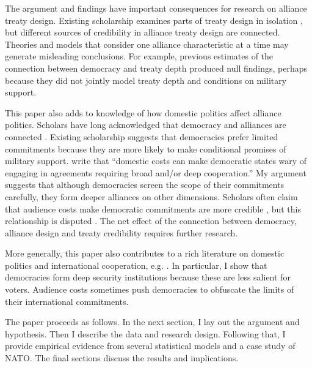 \documentclass[12pt]{article}
\begin{document}
The argument and findings have important consequences for research on alliance treaty design. 
Existing scholarship examines parts of treaty design in isolation \citep{Benson2012, Mattes2012, Chibaetal2015}, but different sources of credibility in alliance treaty design are connected. 
Theories and models that consider one alliance characteristic at a time may generate misleading conclusions. 
For example, previous estimates of the connection between democracy and treaty depth produced null findings, perhaps because they did not jointly model treaty depth and conditions on military support. 


This paper also adds to knowledge of how domestic politics affect alliance politics. 
Scholars have long acknowledged that democracy and alliances are connected \citep{LaiReiter2000, GiblerWolford2006, Warren2016, McManusYarhi-Milo2017}. 
Existing scholarship suggests that democracies prefer limited commitments \citep{Mattes2012, Chibaetal2015} because they are more likely to make conditional promises of military support. 
\citet{Chibaetal2015} write that ``domestic costs can make democratic states wary of engaging in agreements requiring broad and/or deep cooperation.'' 
My argument suggests that although democracies screen the scope of their commitments carefully, they form deeper alliances on other dimensions.  
Scholars often claim that audience costs make democratic commitments are more credible \citep{Gaubatz1996, DigiuseppePoast2016}, but this relationship is disputed \citep{GartzkeGleditsch2004, DownesSechser2012}. 
The net effect of the connection between democracy, alliance design and treaty credibility requires further research. 


More generally, this paper also contributes to a rich literature on domestic politics and international cooperation, e.g. \citep{DownesRocke1995, Fearon1998, Leeds1999, MattesRodriguez2014}. 
In particular, I show that democracies form deep security institutions because these are less salient for voters. 
Audience costs sometimes push democracies to obfuscate the limits of their international commitments. 


The paper proceeds as follows. 
In the next section, I lay out the argument and hypothesis. 
Then I describe the data and research design. 
Following that, I provide empirical evidence from several statistical models and a case study of NATO. 
The final sections discuss the results and implications. 
\end{document}
